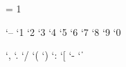 \XeTeXinterchartokenstate = 1
\newXeTeXintercharclass \charHalbgeviert
\newXeTeXintercharclass \charNummerEins
\newXeTeXintercharclass \charNummerZwei
\newXeTeXintercharclass \charNummerDrei
\newXeTeXintercharclass \charNummerVier
\newXeTeXintercharclass {}
\newXeTeXintercharclass \charNummerSechs
\newXeTeXintercharclass \charNummerSieben
\newXeTeXintercharclass \charNummerAcht
\newXeTeXintercharclass \charNummerNeun
\newXeTeXintercharclass \charNummerNull

\newXeTeXintercharclass \charKomma
\newXeTeXintercharclass \charPunkt
\newXeTeXintercharclass \charSlash
\newXeTeXintercharclass \charParens
\newXeTeXintercharclass \charDivis
\newXeTeXintercharclass \charKzg
\newXeTeXintercharclass \charColon

\newXeTeXintercharclass \chara
\newXeTeXintercharclass \charb
\newXeTeXintercharclass \charc
\newXeTeXintercharclass \chard
\newXeTeXintercharclass \chare
\newXeTeXintercharclass \charf
\newXeTeXintercharclass \charg
\newXeTeXintercharclass \charh
\newXeTeXintercharclass \chari
\newXeTeXintercharclass \chark
\newXeTeXintercharclass \charl
\newXeTeXintercharclass \charm
\newXeTeXintercharclass \charn
\newXeTeXintercharclass \charo
\newXeTeXintercharclass \charp
\newXeTeXintercharclass \charr
\newXeTeXintercharclass \chars
\newXeTeXintercharclass \chart
\newXeTeXintercharclass \charu
\newXeTeXintercharclass \charv
\newXeTeXintercharclass \charx
\newXeTeXintercharclass \charz

\newXeTeXintercharclass \charA
\newXeTeXintercharclass \charD
\newXeTeXintercharclass \charE
\newXeTeXintercharclass \charG
\newXeTeXintercharclass \charH
\newXeTeXintercharclass \charI
\newXeTeXintercharclass \charJ
\newXeTeXintercharclass \charK
\newXeTeXintercharclass \charM
\newXeTeXintercharclass \charP
\newXeTeXintercharclass \charS
\newXeTeXintercharclass \charT
\newXeTeXintercharclass \charV
\newXeTeXintercharclass \charW
\newXeTeXintercharclass \charX
\newXeTeXintercharclass \charZ

\XeTeXcharclass `– \charHalbgeviert
\XeTeXcharclass `1 \charNummerEins
\XeTeXcharclass `2 \charNummerZwei
\XeTeXcharclass `3 \charNummerDrei
\XeTeXcharclass `4 \charNummerVier
\XeTeXcharclass `5 
\XeTeXcharclass `6 \charNummerSechs
\XeTeXcharclass `7 \charNummerSieben
\XeTeXcharclass `8 \charNummerAcht
\XeTeXcharclass `9 \charNummerNeun
\XeTeXcharclass `0 \charNummerNull

\XeTeXcharclass `, \charKomma
\XeTeXcharclass `. \charPunkt
\XeTeXcharclass `/ \charSlash
\XeTeXcharclass `( \charParens	
\XeTeXcharclass `) \charParens
\XeTeXcharclass `: \charColon
\XeTeXcharclass `[ \charParens
\XeTeXcharclass `- \charDivis
\XeTeXcharclass `ˈ \charKzg

